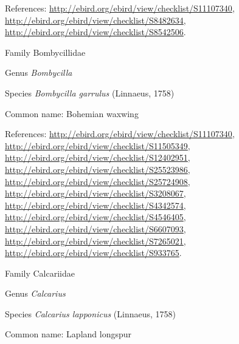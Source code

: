 \documentclass[9pt, article]{memoir}
\begin{document}
\begin{multicols}{2}
References: 
\url{http://ebird.org/ebird/view/checklist/S11107340}, 
\url{http://ebird.org/ebird/view/checklist/S8482634}, 
\url{http://ebird.org/ebird/view/checklist/S8542506}.

\vspace{6pt}\noindent\hspace{24pt}Family Bombycillidae


\vspace{6pt}\noindent\hspace{30pt}Genus \textit{Bombycilla}


\vspace{6pt}\noindent\hspace{36pt}Species \textit{Bombycilla garrulus} (Linnaeus, 1758)


Common name: Bohemian waxwing

References: 
\url{http://ebird.org/ebird/view/checklist/S11107340}, 
\url{http://ebird.org/ebird/view/checklist/S11505349}, 
\url{http://ebird.org/ebird/view/checklist/S12402951}, 
\url{http://ebird.org/ebird/view/checklist/S25523986}, 
\url{http://ebird.org/ebird/view/checklist/S25724908}, 
\url{http://ebird.org/ebird/view/checklist/S3208067}, 
\url{http://ebird.org/ebird/view/checklist/S4342574}, 
\url{http://ebird.org/ebird/view/checklist/S4546405}, 
\url{http://ebird.org/ebird/view/checklist/S6607093}, 
\url{http://ebird.org/ebird/view/checklist/S7265021}, 
\url{http://ebird.org/ebird/view/checklist/S933765}.

\vspace{6pt}\noindent\hspace{24pt}Family Calcariidae


\vspace{6pt}\noindent\hspace{30pt}Genus \textit{Calcarius}


\vspace{6pt}\noindent\hspace{36pt}Species \textit{Calcarius lapponicus} (Linnaeus, 1758)


Common name: Lapland longspur


\end{multicols}
\end{document}
